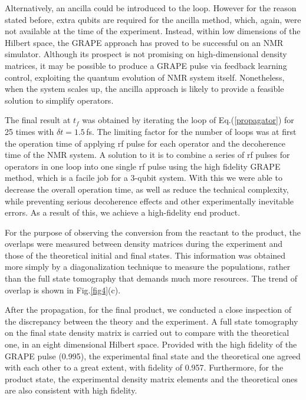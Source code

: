 \documentclass[8.5pt,twoside,twocolumn]{article}
\begin{document}
\fi


Alternatively, an ancilla\cite{Polynomial_time_algorithm}
could be introduced to the loop.
However for the reason stated before,
extra qubits are required for the ancilla method,
which, again, were not available at the time of the experiment.
Instead, within low dimensions of the Hilbert space,
the GRAPE approach has proved to be
successful on an NMR simulator. Although its prospect is not
promising on high-dimensional density matrices,
it may be possible to produce a GRAPE pulse via feedback
learning control, exploiting the quantum evolution of
NMR system itself. Nonetheless, when the system scales up,
the ancilla approach is likely to provide a feasible solution
to simplify operators.

The final result at $t_f$
was obtained by iterating the loop of Eq.(\ref{propagator})
for 25 times with $\delta t=1.5\,$fs.
The limiting factor for the number of loops was at first
the operation time of applying rf pulse
for each operator and the decoherence time of the NMR system.
A solution to it is to combine a series of rf pulses for operators
in one loop
into one single rf pulse using the high fidelity GRAPE method,
which is a facile job for a 3-qubit system. With this
we were able to decrease the overall operation time,
as well as reduce the technical complexity,
while preventing serious decoherence effects
and other experimentally inevitable errors.
As a result of this, we achieve a high-fidelity end product.

For the purpose of observing the conversion from the reactant to
the product, the overlaps were measured between density matrices
during the experiment and those of the theoretical initial and final states.
This information was obtained
more simply by a diagonalization technique\cite{NMR_dynamic}
to measure the populations,
rather than the full state tomography
that demands much more resources.
The trend of overlap is shown in Fig.\ref{fig4}(c).

After the propagation, for the final product, we conducted
a close inspection of the discrepancy between the theory
and the experiment.
A full state tomography on the final state density matrix
is carried out to compare with the theoretical one,
in an eight dimensional Hilbert space.
Provided with the high fidelity of the GRAPE pulse (0.995),
the experimental final state and the theoretical one
agreed with each other to a great extent,
with fidelity of 0.957.
Furthermore, for the product state,
the experimental density matrix elements
and the theoretical ones are also consistent with high fidelity.
\end{document}
